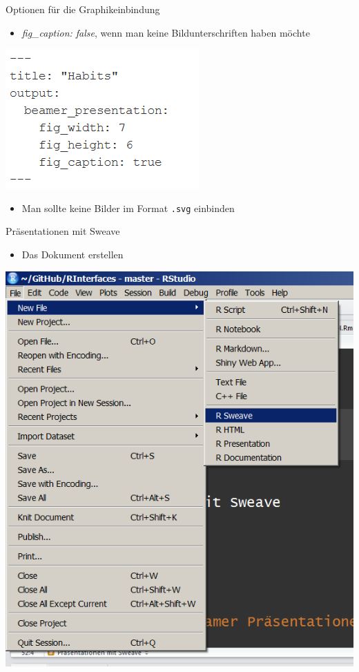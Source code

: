 \documentclass[ignorenonframetext,]{beamer}
\providecommand{\tightlist}{%
\setlength{\itemsep}{0pt}\setlength{\parskip}{0pt}}
\begin{document}
\begin{frame}[fragile]{Optionen für die Graphikeinbindung}

\begin{itemize}
\tightlist
\item
  \emph{fig\_caption: false}, wenn man keine Bildunterschriften haben
  möchte
\end{itemize}

\includegraphics{./tex2pdf.956/391410b708b66c2ec08aaecab08f73fa1faa805e.png}

\begin{itemize}
\tightlist
\item
  Man sollte keine Bilder im Format \texttt{.svg} einbinden
\end{itemize}

\end{frame}

\begin{frame}{Präsentationen mit Sweave}

\begin{itemize}
\tightlist
\item
  Das Dokument erstellen
\end{itemize}

\includegraphics{./tex2pdf.956/eec89c723aaf72023735cae9394dd2ecd7c8fded.png}

\end{frame}
\end{document}

